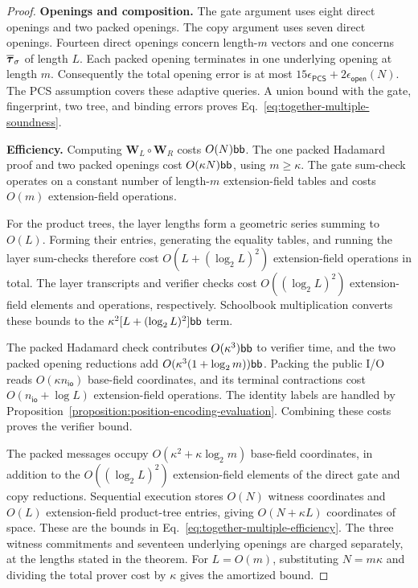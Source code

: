 \begin{proof}
\smallskip\noindent\textbf{Openings and composition.}
The gate argument uses eight direct openings and two packed
openings. The copy argument uses seven direct openings.
Fourteen direct openings concern length-\(m\) vectors and
one concerns \(\overline{\bm\tau}_\sigma\) of length \(L\).
Each packed opening terminates in one underlying opening at
length \(m\). Consequently the total opening error is at most
\(15\epsilon_{\mathsf{PCS}}+2\epsilon_{\mathsf{open}}(N)\).
The PCS assumption covers these adaptive queries.
A union bound with the gate, fingerprint, two tree, and binding
errors proves Eq.~\eqref{eq:together-multiple-soundness}.

\smallskip\noindent\textbf{Efficiency.}
Computing \(\bm W_L\circ\bm W_R\) costs \(O(N)\mathsf{bb}\).
The one packed Hadamard proof and two packed openings cost
\(O(\kappa N)\mathsf{bb}\), using \(m\geq\kappa\).
The gate sum-check operates on a constant number of
length-\(m\) extension-field tables and costs
\(O(m)\) extension-field operations.

For the product trees, the layer lengths form a geometric
series summing to \(O(L)\). Forming their entries, generating
the equality tables, and running the layer sum-checks therefore
cost \(O(L+(\log_2L)^2)\) extension-field operations in total.
The layer transcripts and verifier checks cost
\(O((\log_2L)^2)\) extension-field elements and operations,
respectively.
Schoolbook multiplication converts these bounds to the
\(\kappa^2[L+(\log_2L)^2]\mathsf{bb}\) term.

The packed Hadamard check contributes \(O(\kappa^3)\mathsf{bb}\)
to verifier time, and the two packed opening reductions add
\(O(\kappa^3(1+\log_2m))\mathsf{bb}\).
Packing the public I/O reads \(O(\kappa n_{\mathsf{io}})\)
base-field coordinates, and its terminal contractions cost
\(O(n_{\mathsf{io}}+\log L)\) extension-field operations.
The identity labels are handled by
Proposition~\ref{proposition:position-encoding-evaluation}.
Combining these costs proves the verifier bound.

The packed messages occupy \(O(\kappa^2+\kappa\log_2m)\)
base-field coordinates, in addition to the
\(O((\log_2L)^2)\) extension-field elements of the direct
gate and copy reductions.
Sequential execution stores \(O(N)\) witness coordinates and
\(O(L)\) extension-field product-tree entries, giving
\(O(N+\kappa L)\) coordinates of space.
These are the bounds in
Eq.~\eqref{eq:together-multiple-efficiency}.
The three witness commitments and seventeen underlying openings
are charged separately, at the lengths stated in the theorem.
For \(L=O(m)\), substituting \(N=m\kappa\) and dividing the
total prover cost by \(\kappa\) gives the amortized bound.
\end{proof}
